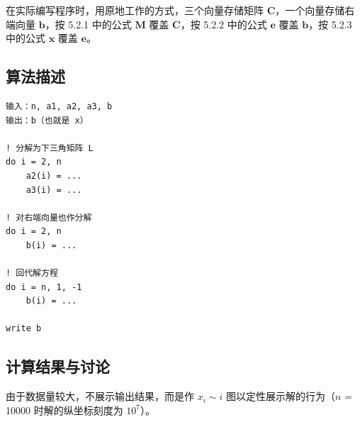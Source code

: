 \documentclass{ctexart}
\begin{document}
在实际编写程序时，用原地工作的方式，三个向量存储矩阵 $\mathbf C$，一个向量存储右端向量 $\mathbf b$，按 5.2.1 中的公式 $\mathbf M$ 覆盖 $\mathbf C$，按 5.2.2 中的公式 $\mathbf e$ 覆盖 $\mathbf b$，按 5.2.3 中的公式 $\mathbf x$ 覆盖 $\mathbf e$。
\subsection{算法描述}
\begin{lstlisting}
输入：n, a1, a2, a3, b
输出：b（也就是 x）

! 分解为下三角矩阵 L
do i = 2, n
    a2(i) = ...
    a3(i) = ...

! 对右端向量也作分解
do i = 2, n
    b(i) = ...

! 回代解方程
do i = n, 1, -1
    b(i) = ...

write b
\end{lstlisting}
\subsection{计算结果与讨论}
由于数据量较大，不展示输出结果，而是作 $x_i\sim i$ 图以定性展示解的行为（$n$ = 10000 时解的纵坐标刻度为 $10^7$）。
\end{document}
